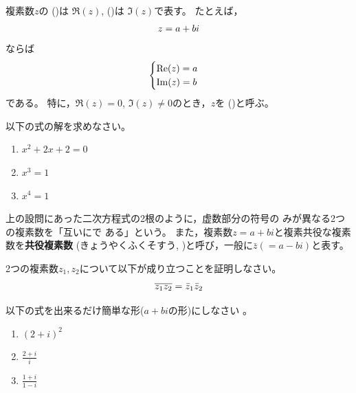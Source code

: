 \documentclass[twocolumn,11pt]{jarticle}
\begin{document}
複素数$z$の
()は
$\Re (z)$\index{$\Re$},
()は
$\Im (z)$\index{$\Im$}で表す。
たとえば，
\begin{align}
z=a+bi \notag
\end{align}
ならば
\begin{align}
  \begin{cases}
    \Re (z)=a\\
    \Im (z)=b
  \end{cases}\notag
\end{align}
である。
特に，$\Re (z)=0$, $\Im (z)\ne 0$のとき，$z$を
()と呼ぶ。

\nquestion\label{eq:eq-complex}
以下の式の解を求めなさい。
\begin{enumerate}
\item $x^2+2x+2=0$
\item $x^3=1$
\item $x^4=1$
\end{enumerate}

\comment 上の設問にあった二次方程式の2根のように，虚数部分の符号の
みが異なる2つの複素数を「互いにで
ある」という。
また，複素数$z=a+bi$と複素共役な複素数を\textbf{共役複素数}
(きょうやくふくそすう, )と呼び，一般に$\bar{z}(=a-bi)$と表す。

\nquestion
2つの複素数$z_1,z_2$について以下が成り立つことを証明しなさい。
\begin{align}
  \overline{z_1z_2}=\bar{z}_1\bar{z}_2\notag
\end{align}

\exercise
 以下の式を出来るだけ簡単な形($a+bi$の形)にしなさい
。
  \begin{enumerate}
  \item\label{iitem:(2+i)^2} $(2+i)^2$
  \item\label{iitem:(2+i)/i} $\displaystyle\frac{2+i}{i}$
  \item\label{iitem:(1+i)/(1-i)} $\displaystyle\frac{1+i}{1-i}$
  \end{enumerate}
\end{document}
